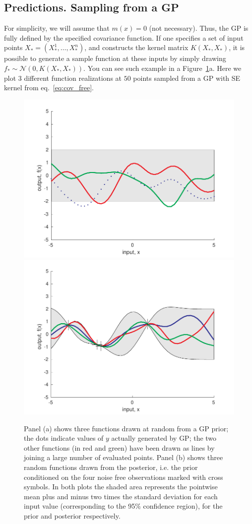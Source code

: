 \documentclass{article}[12pt]
\begin{document}
\subsection{Predictions. Sampling from a GP}
For simplicity, we will assume that $m(x)=0$ (not necessary). Thus, the GP is fully defined by the specified covariance function. 
If one specifies a set of input points $X_*=(X_*^1,\ldots,X_*^n)$, and constructs the kernel matrix $K(X_*,X_*)$, it is possible to generate a sample function at these inputs by simply drawing $f_*\sim\mathcal{N}(0,K(X_*,X_*))$. You can see such example in a Figure~\ref{fig:noise_free}a. Here we plot 3 different function realizations at $50$ points sampled from a GP with SE kernel from eq.~\eqref{eq:cov_free}.

\begin{figure}[h]
	\centering
	\includegraphics[width=.49\textwidth]{figures/prior_free.pdf}
	\hfill
	\includegraphics[width=.49\textwidth]{figures/posterior_free.pdf}
	\caption{Panel (a) shows three functions drawn at random from a GP prior; the dots indicate values of $y$ actually generated by GP; the two other functions (in red and green) have been drawn as lines by joining a large number of evaluated points. Panel (b) shows three random functions drawn from the posterior, i.e. the prior conditioned on
		the four noise free observations marked with cross symbols. In both plots the shaded area represents the
		pointwise mean plus and minus two times the standard deviation for each input value
		(corresponding to the 95\% confidence region), for the prior and posterior respectively.}
	\label{fig:noise_free}
\end{figure}
\end{document}
